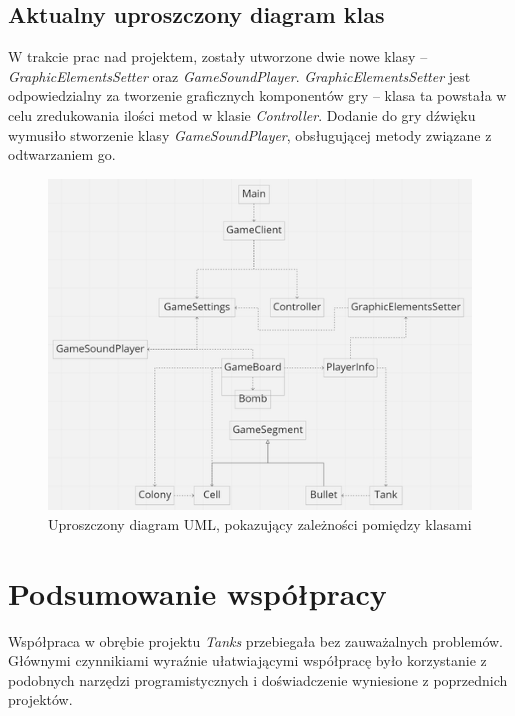 \documentclass[11pt,a4paper]{report}
\begin{document}
\subsection {Aktualny uproszczony diagram klas}
W trakcie prac nad projektem, zostały utworzone dwie  nowe klasy -- \textsl{GraphicElementsSetter} oraz \textsl{GameSoundPlayer}.
\textsl{GraphicElementsSetter} jest odpowiedzialny za tworzenie graficznych komponentów gry -- klasa ta powstała w celu zredukowania ilości metod w klasie \textsl{Controller}.
Dodanie do gry dźwięku wymusiło stworzenie  klasy \textsl{GameSoundPlayer}, obsługującej metody związane z odtwarzaniem go.
\newpage
\begin{figure}[ht!]
\centerline{\includegraphics{img/diagram_klas.png}}
\caption{Uproszczony diagram UML, pokazujący zależności pomiędzy klasami}
\end{figure}

\newpage

\section{Podsumowanie współpracy}\label{sec:teskt}
Współpraca w obrębie projektu \textsl{Tanks} przebiegała bez zauważalnych problemów. Głównymi czynnikiami wyraźnie ułatwiającymi współpracę było korzystanie z podobnych narzędzi programistycznych i doświadczenie wyniesione z poprzednich projektów.
\end{document}
